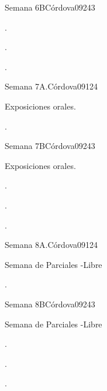 \begin{syllabus}
\begin{unit}{Semana 6B}{}{Córdova09}{24}{3}
   \begin{learningoutcomes}
      \item . 
      \item .
      \item . 
      \end{learningoutcomes}
\end{unit}

\begin{unit}{Semana 7A.}{}{Córdova09}{12}{4}
   \begin{topics}
      \item Exposiciones orales.
   \end{topics}
   \begin{learningoutcomes}
      \item . 
   \end{learningoutcomes}
\end{unit}

\begin{unit}{Semana 7B}{}{Córdova09}{24}{3}
   \begin{topics}
      \item Exposiciones orales.
   \end{topics}

   \begin{learningoutcomes}
      \item . 
      \item .
      \item . 
      \end{learningoutcomes}
\end{unit}

\begin{unit}{Semana 8A.}{}{Córdova09}{12}{4}
   \begin{topics}
      \item Semana de Parciales -Libre
   \end{topics}
   \begin{learningoutcomes}
      \item . 
   \end{learningoutcomes}
\end{unit}

\begin{unit}{Semana 8B}{}{Córdova09}{24}{3}
   \begin{topics}
      \item Semana de Parciales -Libre
   \end{topics}

   \begin{learningoutcomes}
      \item . 
      \item .
      \item . 
      \end{learningoutcomes}
\end{unit}


\end{syllabus}
